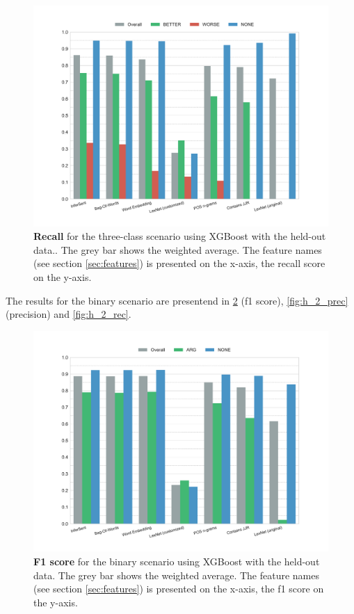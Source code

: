     \begin{figure}[htbp]
              \caption{\textbf{Recall} for the three-class scenario using XGBoost with the held-out data.. The grey bar shows the weighted average. The feature names (see section \ref{sec:features}) is presented on the x-axis, the recall score on the y-axis.} 
       \label{fig:h_3_rec}
 \centering
	\includegraphics[width=0.9\linewidth]{images/heldout/h-recall-False}

\end{figure}

\FloatBarrier

The results for the binary scenario are presentend in \ref{fig:h_2_f1} (f1 score), \ref{fig:h_2_prec} (precision) and \ref{fig:h_2_rec}.

\begin{figure}[htbp]
         \caption{\textbf{F1 score} for the binary scenario using XGBoost with the held-out data. The grey bar shows the weighted average. The feature names (see section \ref{sec:features}) is presented on the x-axis, the f1 score on the y-axis.} 
    \label{fig:h_2_f1}
    \centering
	\includegraphics[width=0.9\linewidth]{images/heldout/h-f1-True}
    \end{figure}


